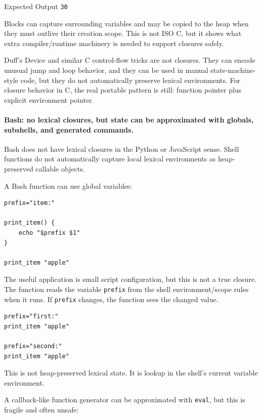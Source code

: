 \documentclass[a4paper,twoside]{report}
\begin{document}
\begin{iobox}{Expected Output}
\texttt{30} \\
\end{iobox}



Blocks can capture surrounding variables and may be copied to the heap when they must outlive their creation scope. This is not ISO C, but it shows what extra compiler/runtime machinery is needed to support closures safely.

Duff's Device and similar C control-flow tricks are not closures. They can encode unusual jump and loop behavior, and they can be used in manual state-machine-style code, but they do not automatically preserve lexical environments. For closure behavior in C, the real portable pattern is still: function pointer plus explicit environment pointer.

\paragraph{Bash: no lexical closures, but state can be approximated with globals, subshells, and generated commands.}

Bash does not have lexical closures in the Python or JavaScript sense. Shell functions do not automatically capture local lexical environments as heap-preserved callable objects.

A Bash function can use global variables:

\begin{verbatim}
prefix="item:"

print_item() {
    echo "$prefix $1"
}

print_item "apple"
\end{verbatim}

The useful application is small script configuration, but this is not a true closure. The function reads the variable \texttt{prefix} from the shell environment/scope rules when it runs. If \texttt{prefix} changes, the function sees the changed value.

\begin{verbatim}
prefix="first:"
print_item "apple"

prefix="second:"
print_item "apple"
\end{verbatim}

This is not heap-preserved lexical state. It is lookup in the shell's current variable environment.

A callback-like function generator can be approximated with \texttt{eval}, but this is fragile and often unsafe:
\end{document}
